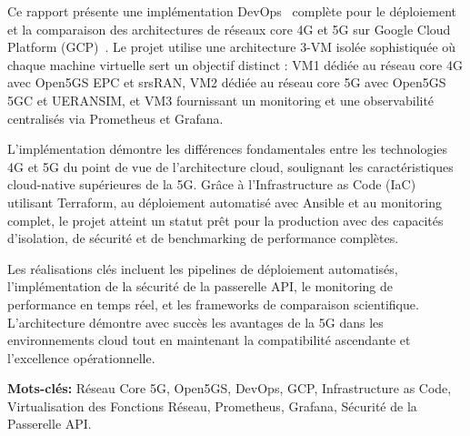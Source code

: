 \documentclass[12pt,a4paper]{report}
\begin{document}
\begin{titlepage}
    \begin{minipage}{0.85\textwidth} %
        \setlength{\parindent}{0pt} %
        Ce rapport présente une implémentation DevOps~\cite{devops-culture} complète pour le déploiement et la comparaison des architectures de réseaux core 4G et 5G sur Google Cloud Platform (GCP)~\cite{gcp-docs}. Le projet utilise une architecture 3-VM isolée sophistiquée où chaque machine virtuelle sert un objectif distinct : VM1 dédiée au réseau core 4G avec Open5GS EPC et srsRAN, VM2 dédiée au réseau core 5G avec Open5GS 5GC et UERANSIM, et VM3 fournissant un monitoring et une observabilité centralisés via Prometheus et Grafana.
        \par\vspace{0.3cm}
        L'implémentation démontre les différences fondamentales entre les technologies 4G et 5G du point de vue de l'architecture cloud, soulignant les caractéristiques cloud-native supérieures de la 5G. Grâce à l'Infrastructure as Code (IaC) utilisant Terraform, au déploiement automatisé avec Ansible et au monitoring complet, le projet atteint un statut prêt pour la production avec des capacités d'isolation, de sécurité et de benchmarking de performance complètes.
        \par\vspace{0.3cm}
        Les réalisations clés incluent les pipelines de déploiement automatisés, l'implémentation de la sécurité de la passerelle API, le monitoring de performance en temps réel, et les frameworks de comparaison scientifique. L'architecture démontre avec succès les avantages de la 5G dans les environnements cloud tout en maintenant la compatibilité ascendante et l'excellence opérationnelle.
        
        \vspace{0.8cm}
        {\bfseries Mots-clés:} Réseau Core 5G, Open5GS, DevOps, GCP, Infrastructure as Code, Virtualisation des Fonctions Réseau, Prometheus, Grafana, Sécurité de la Passerelle API.
    \end{minipage}

\end{titlepage}

\tableofcontents
\newpage

\listoffigures
\listoftables
\newpage
\end{document}
